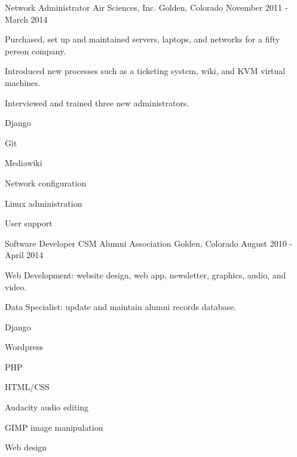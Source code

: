 \begin{cventries}
  \cventry
    {Network Administrator} %
    {Air Sciences, Inc.} %
    {Golden, Colorado} %
    {November 2011 - March 2014} %
    {%
      \begin{cvitems} %
        \item {Purchased, set up and maintained servers, laptops, and networks for a fifty person company.}
        \item {Introduced new processes such as a ticketing system, wiki, and KVM virtual machines.}
        \item {Interviewed and trained three new administrators.}
      \end{cvitems}
    }
    \begin{cventryskills}
      \item Django
      \item Git
      \item Mediawiki
      \item Network configuration
      \item Linux administration
      \item User support
    \end{cventryskills}

  \cventry
    {Software Developer} %
    {CSM Alumni Association} %
    {Golden, Colorado} %
    {August 2010 - April 2014} %
    {%
      \begin{cvitems} %
        \item {Web Development: website design, web app, newsletter, graphics, audio, and video.}
        \item {Data Specialist: update and maintain alumni records database.}
      \end{cvitems}
    }
    \begin{cventryskills}
      \item Django
      \item Wordpress
      \item PHP
      \item HTML/CSS
      \item Audacity audio editing
      \item GIMP image manipulation
      \item Web design
    \end{cventryskills}


\end{cventries}
